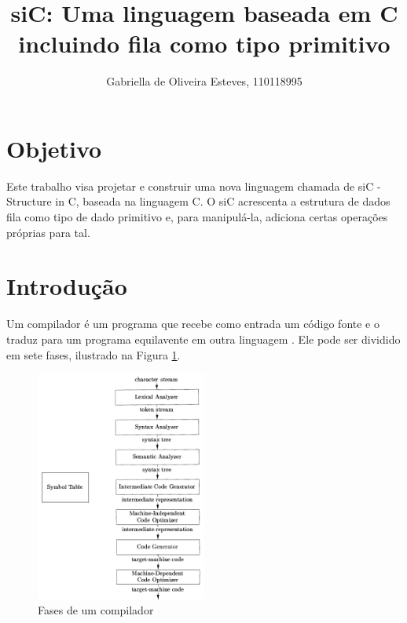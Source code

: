 \documentclass[12pt]{article}
\title{siC: Uma linguagem baseada em C incluindo fila como tipo primitivo}
\author{Gabriella de Oliveira Esteves, 110118995}
\begin{document}
 

\maketitle

\section{Objetivo}

Este trabalho visa projetar e construir uma nova linguagem chamada de siC - Structure in C, baseada na linguagem C. O siC acrescenta a estrutura de dados fila como tipo de dado primitivo e, para manipulá-la, adiciona certas operações próprias para tal.

\section{Introdução}

\indent Um compilador é um programa que recebe como entrada um código fonte e o traduz para um programa equilavente em outra linguagem \cite{book}. Ele pode ser dividido em sete fases, ilustrado na Figura \ref{fig:compilador}.

\begin{figure}[!ht]
  \centering
  \includegraphics[width=0.5\textwidth]{compilador.png}
  \caption{Fases de um compilador} \label{fig:compilador}
\end{figure}
\end{document}
